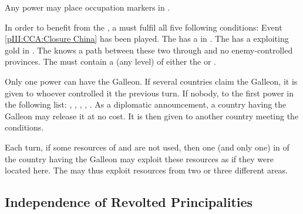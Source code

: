\label{chSpecific:Occupation:Caribbean}
\aparag[] [BLP] Any power may place occupation markers in \continentCaraibes.


\label{chSpecific:Manila Galleon}
\aparag In order to benefit from the , a \MAJ must
fulfil all five following conditions:
\bparag Event \ref{pIII:CCA:Closure China} has been played.
\bparag The \MAJ has a \COL in \granderegionPhilippines.
\bparag The \MAJ has a \COL exploiting gold in .
\bparag The \MAJ knows a path between these two \COL through
 and no enemy-controlled provinces.
\bparag The  must contain a \TradeFLEET (any level) of either the
\MAJ or \paysChine.

\aparag Only one power can have the Galleon. If several countries claim the
Galleon, it is given to whoever controlled it the previous turn. If nobody, to
the first power in the following list: \HIS, \POR, \HOL, \ANG, \FRA.
\bparag As a diplomatic announcement, a country having the Galleon may release
it at no cost. It is then given to another country meeting the conditions.

\aparag Each turn, if some resources of \granderegionNankin and
\granderegionCanton are not used, then one (and only one) \COL in
\granderegionPhilippines of the country having the Galleon may exploit these
resources as if they were located here.
\bparag The \COL may thus exploit resources from two or three different areas.



\subsection{Independence of Revolted
  Principalities}\label{chSpecific:Peace:Independence Revolt}

